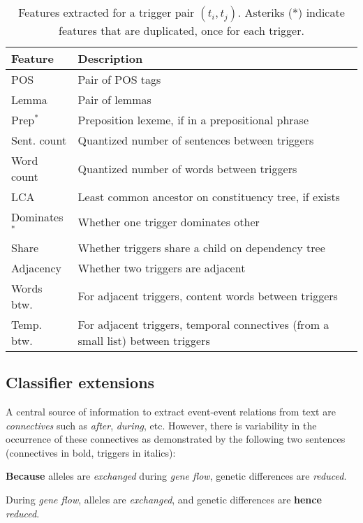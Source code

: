 \begin{table}[t]
\setlength{\tabcolsep}{5pt}
{\scriptsize
\hfill{}
\begin{tabular}{|p{1.3cm}|p{6cm}|}
\hline
\textbf{Feature} &\textbf{Description}\\
\hline
 POS & \scriptsize{Pair of POS tags} \\
Lemma & \scriptsize{Pair of lemmas} \\
Prep$^*$ & \scriptsize{Preposition lexeme, if in a prepositional phrase} \\
Sent. count & \scriptsize{Quantized number of sentences between triggers} \\
Word count & \scriptsize{Quantized number of words between triggers} \\
LCA & \scriptsize{Least common ancestor on constituency tree, if exists} \\
Dominates$^*$ & \scriptsize{Whether one trigger dominates other} \\
Share & \scriptsize{Whether triggers share a child on dependency tree} \\
Adjacency & \scriptsize{Whether two triggers are adjacent} \\
Words btw. & \scriptsize{For adjacent triggers, content words between triggers} \\
Temp. btw. & \scriptsize{For adjacent triggers, temporal connectives (from a small list) between triggers} \\
\hline
\end{tabular}}
\hfill{}
\caption{Features extracted for a trigger pair $(t_i,t_j)$. Asteriks (*) indicate features that are duplicated, once for each trigger.}
\label{tab:features}
\end{table}

\subsection{Classifier extensions} \label{subsec:pairwise-novel}

A central source of information to extract event-event relations from text are \emph{connectives} such as \emph{after}, \emph{during}, etc. However, there is variability in the occurrence of these connectives as demonstrated by the following two sentences (connectives in bold, triggers in italics):

\begin{enumerate} \small{
\item \textbf{Because} alleles are \emph{exchanged} during \emph{gene flow}, genetic differences are \emph{reduced}. \label{sent:1}
\item During \emph{gene flow}, alleles are \emph{exchanged}, and genetic differences are \textbf{hence} \emph{reduced}. \label{sent:2}}
\end{enumerate}

